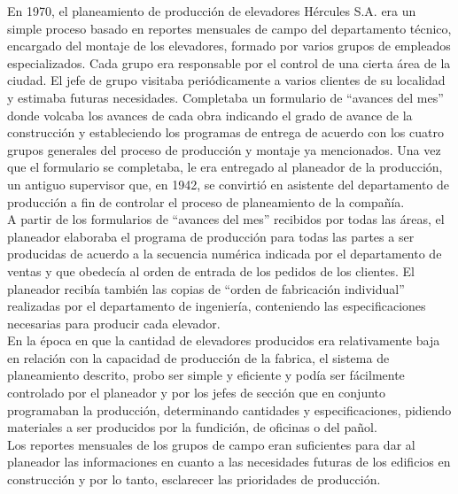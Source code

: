 \documentclass[a4paper,10pt,titlepage]{article}
\begin{document}
		\indent En 1970, el planeamiento de producci\'on de elevadores H\'ercules S.A. era un simple proceso basado en reportes mensuales de campo del departamento t\'ecnico, encargado del montaje de los elevadores, formado por varios grupos de empleados especializados. Cada grupo era responsable por el control de una cierta \'area de la ciudad. El jefe de grupo visitaba peri\'odicamente a varios clientes de su localidad y estimaba futuras necesidades. Completaba un formulario de ``avances del mes'' donde volcaba los avances de cada obra indicando el grado de avance de la construcci\'on y estableciendo los programas de entrega de acuerdo con los cuatro grupos generales del proceso de producci\'on y montaje ya mencionados. Una vez que el formulario se completaba, le era entregado al planeador de la producci\'on, un antiguo supervisor que, en 1942, se convirti\'o en asistente del departamento de producci\'on a fin de controlar el proceso de planeamiento de la compa\~n\'ia.\\
		\indent A partir de los formularios de ``avances del mes'' recibidos por todas las \'areas, el planeador elaboraba el programa de producci\'on para todas las partes a ser producidas de acuerdo a la secuencia num\'erica indicada por el departamento de ventas y que obedec\'ia al orden de entrada de los pedidos de los clientes. El planeador recib\'ia tambi\'en las copias de ``orden de fabricaci\'on individual'' realizadas por el departamento de ingenier\'ia, conteniendo las especificaciones necesarias para producir cada elevador.\\ 
		\indent En la \'epoca en que la cantidad de elevadores producidos era relativamente baja en relaci\'on con la capacidad de producci\'on de la fabrica, el sistema de planeamiento descrito, probo ser simple y eficiente y pod\'ia ser f\'acilmente controlado por el planeador y por los jefes de secci\'on que en conjunto programaban la producci\'on, determinando cantidades y especificaciones, pidiendo materiales a ser producidos por la fundici\'on, de oficinas o del pa\~nol.\\
		\indent Los reportes mensuales de los grupos de campo eran suficientes para dar al planeador las informaciones en cuanto a las necesidades futuras de los edificios en construcci\'on y por lo tanto, esclarecer las prioridades de producci\'on.\\
\end{document}
